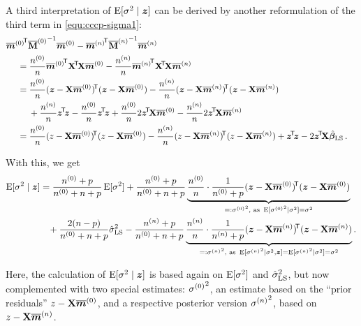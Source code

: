 A third interpretation of $\operatorname{E}[\sigma^2\mid {\bm z}]$
can be derived by another reformulation of the third term in \eqref{equ:cccp-sigma1}:
\begin{align*}
\lefteqn{
    {\tmz}^\tra {\tMz}^{-1} \tmz
  - {\tmn}^\tra {\tMn}^{-1} \tmn }\hspace*{3ex} \\
&=  \frac{\nz}{n} {\tmz}^\tra \XtX \tmz
  - \frac{\nn}{n} {\tmn}^\tra \XtX \tmn \\
&=  \frac{\nz}{n} (\z - \X\tmz)^\tra (\z - \X\tmz)
  - \frac{\nn}{n} (\z - \X\tmn)^\tra (\z - \X\tmn) \\ & \hspace*{3ex}
  + \frac{\nn}{n} \ztz      - \frac{\nz}{n} \ztz
  + \frac{\nz}{n} 2\ztX\tmz - \frac{\nn}{n} 2\ztX\tmn \\
&=  \frac{\nz}{n} (z - \X\tmz)^\tra (z - \X\tmz)
  - \frac{\nn}{n} (z - \X\tmn)^\tra (z - \X\tmn) %
  + \ztz
  - 2\ztX\bls \,. %
\end{align*}

With this, we get
\begin{align}
\E[\sigma^2\mid \z] &= \frac{\nz + p} {\nz + n + p} \E[\sigma^2]
                      +\frac{\nz + p} {\nz + n + p}
                        \underbrace{\frac{\nz}{n} \cdot \frac{1}{\nz + p}
                                    (\z - \X\tmz)^\tra (\z - \X\tmz)}_{=: {\sigma\uz}^2, \text{ as }
                                                                       \E[{\sigma\uz}^2\mid\sigma^2] = \sigma^2} \nonumber\\ & \hspace*{2ex}
                      +\frac{2(n - p)}{\nz + n + p} \sls
                      -\frac{\nn + p} {\nz + n + p}
                        \underbrace{\frac{\nn}{n} \cdot \frac{1}{\nn + p}
                                    (\z - \X\tmn)^\tra (\z - \X\tmn)}_{=: {\sigma\un}^2, \text{ as }
                                                                       \E[{\sigma\un}^2\mid\sigma^2,\z] = \E[{\sigma\un}^2\mid\sigma^2] = \sigma^2} %
                                                                         .
\label{equ:cccp-sigma3}%
\end{align}

Here, the calculation of $\operatorname{E}[\sigma^2\mid {\bm z}]$ is based
again on $\operatorname{E}[\sigma^2]$ and $\hat{\sigma}^2_\text{LS}$, but now complemented with
two special estimates:
${\sigma^{(0)}}^2$, an estimate based on the ``prior residuals'' $z - \mathbf{X}\overline{{\bm m}}^{(0)}$,
and a respective posterior version ${\sigma^{(n)}}^2$, based on $z - \mathbf{X}\overline{{\bm m}}^{(n)}$.

